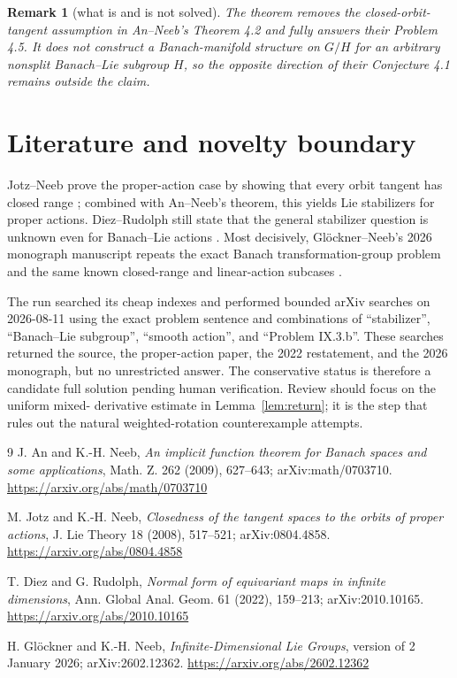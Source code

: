 \documentclass[11pt]{article}
\newtheorem{remark}[theorem]{Remark}
\begin{document}
\begin{remark}[what is and is not solved]
The theorem removes the closed-orbit-tangent assumption in An--Neeb's
Theorem 4.2 and fully answers their Problem 4.5.  It does not construct a
Banach-manifold structure on $G/H$ for an arbitrary nonsplit Banach--Lie
subgroup $H$, so the opposite direction of their Conjecture 4.1 remains
outside the claim.
\end{remark}

\section{Literature and novelty boundary}

Jotz--Neeb prove the proper-action case by showing that every orbit tangent
has closed range \cite{JN}; combined with An--Neeb's theorem, this yields Lie
stabilizers for proper actions.  Diez--Rudolph still state that the general
stabilizer question is unknown even for Banach--Lie actions
\cite{DR}.  Most decisively, Gl\"ockner--Neeb's 2026 monograph manuscript
repeats the exact Banach transformation-group problem and the same known
closed-range and linear-action subcases \cite{GN}.

The run searched its cheap indexes and performed bounded arXiv searches on
2026-08-11 using the exact problem sentence and combinations of
``stabilizer'', ``Banach--Lie subgroup'', ``smooth action'', and
``Problem IX.3.b''.  These searches returned the source, the proper-action
paper, the 2022 restatement, and the 2026 monograph, but no unrestricted
answer.  The conservative status is therefore a candidate full solution
pending human verification.  Review should focus on the uniform mixed-
derivative estimate in Lemma~\ref{lem:return}; it is the step that rules out
the natural weighted-rotation counterexample attempts.

\begin{thebibliography}{9}
J. An and K.-H. Neeb,
\emph{An implicit function theorem for Banach spaces and some applications},
Math. Z. 262 (2009), 627--643; arXiv:math/0703710.
\url{https://arxiv.org/abs/math/0703710}

M. Jotz and K.-H. Neeb,
\emph{Closedness of the tangent spaces to the orbits of proper actions},
J. Lie Theory 18 (2008), 517--521; arXiv:0804.4858.
\url{https://arxiv.org/abs/0804.4858}

T. Diez and G. Rudolph,
\emph{Normal form of equivariant maps in infinite dimensions},
Ann. Global Anal. Geom. 61 (2022), 159--213; arXiv:2010.10165.
\url{https://arxiv.org/abs/2010.10165}

H. Gl\"ockner and K.-H. Neeb,
\emph{Infinite-Dimensional Lie Groups}, version of 2 January 2026;
arXiv:2602.12362.
\url{https://arxiv.org/abs/2602.12362}
\end{thebibliography}
\end{document}
